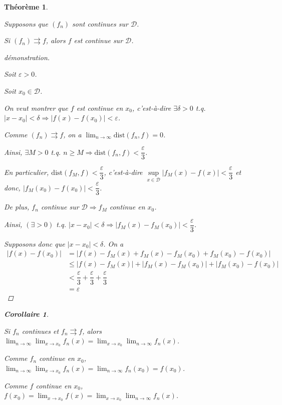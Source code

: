 \documentclass{report}
\newcommand*{\dlim}[3]{\displaystyle\lim_{#1 \to #2}#3}
\newcommand*{\abs}[1]{\left| #1 \right|}
\newcommand*{\convabs}{\rightrightarrows}
\newcommand*{\eps}{\varepsilon}
\newtheorem*{thm}{Th\'eor\`eme}
\newtheorem*{coro}{Corollaire}
\theoremstyle{definition}
\theoremstyle{remark}
\begin{document}
	\begin{thm}
		~

		Supposons que $(f_n)$ sont continues sur $\mathcal{D}$.

		Si $(f_n) \convabs f$, alors $f$ est continue sur $\mathcal{D}$.
		\begin{proof}[d\'emonstration]~

			Soit $\eps>0$.

			Soit $x_0 \in \mathcal{D}$.

			On veut montrer que $f$ est continue en $x_0$, c'est-\`a-dire $\exists\delta>0$ t.q. $\abs{x-x_0}<\delta \Rightarrow \abs{f(x)-f(x_0)}<\eps$.

			Comme $(f_n) \convabs f$, on a $\dlim{n}{\infty}{\mathrm{dist}(f_n,f)}=0$.

			Ainsi, $\exists M>0$ t.q. $n \geq M \Rightarrow \mathrm{dist}(f_n,f) < \dfrac{\eps}{3}$.

			En particulier, $\mathrm{dist}(f_M,f) < \dfrac{\eps}{3}$, c'est-\`a-dire $\sup\limits_{x \in \mathcal{D}}\abs{f_M(x)-f(x)} < \dfrac{\eps}{3}$ et donc, $\abs{f_M(x_0)-f(x_0)} < \dfrac{\eps}{3}$.

			De plus, $f_n$ continue sur $\mathcal{D} \Rightarrow f_M$ continue en $x_0$.

			Ainsi, $(\exists>0)$ t.q. $\abs{x-x_0} < \delta \Rightarrow \abs{f_M(x)-f_M(x_0)} < \dfrac{\eps}{3}$.

			Supposons donc que $\abs{x-x_0} < \delta$. On a
			\begin{align*}
				\abs{f(x)-f(x_0)}&= \abs{f(x) - f_M(x) + f_M(x) - f_M(x_0) + f_M(x_0) - f(x_0)}\\
				&\leq \abs{f(x)-f_M(x)} + \abs{f_M(x)-f_M(x_0)} + \abs{f_M(x_0)-f(x_0)}\\
				&< \dfrac{\eps}{3} + \dfrac{\eps}{3} + \dfrac{\eps}{3}\\
				&= \eps
			\end{align*}
		\end{proof}
		\begin{coro}
			~

			Si $f_n$ continues et $f_n \convabs f$, alors $\dlim{n}{\infty}{\dlim{x}{x_0}{f_n(x)}} = \dlim{x}{x_0}{\dlim{n}{\infty}{f_n(x)}}$.

			Comme $f_n$ continue en $x_0$, $\dlim{n}{\infty}{\dlim{x}{x_0}{f_n(x)}} = \dlim{n}{\infty}{f_n(x_0)} = f(x_0)$.

			Comme $f$ continue en $x_0$, $f(x_0) = \dlim{x}{x_0}{f(x)} = \dlim{x}{x_0}{\dlim{n}{\infty}{f_n(x)}}$.
		\end{coro}
	\end{thm}
\end{document}
